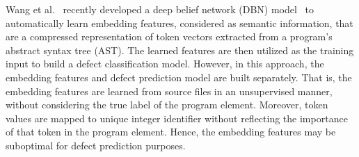 
Wang et al.~\cite{wang2016automatically} recently developed a deep belief network (DBN) model~\cite{hinton2009deep} to automatically learn embedding features, considered as semantic information, that are a compressed representation of token vectors extracted from a program's abstract syntax tree (AST). The learned features are then utilized as the training input to build a defect classification model. However, in this approach, the embedding features and defect prediction model are built separately.
That is, the embedding features are learned from source files in an unsupervised manner, without considering the true label of the program element. Moreover, token values are mapped to unique integer identifier without reflecting the importance of that token in the program element. Hence, the embedding features may be suboptimal for defect prediction purposes. 


